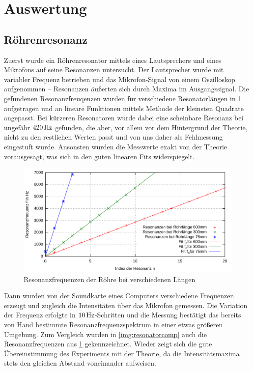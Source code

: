\documentclass[numbers=noenddot,12pt,a4paper]{scrartcl}
\begin{document}
\fancyfoot[L]{\textit{}}
\newpage
\fancyfoot[L]{}

\section{Auswertung}

\subsection{Röhrenresonanz}
Zuerst wurde ein Röhrenresonator mittels eines Lautsprechers und eines Mikrofons auf seine Resonanzen untersucht. Der Lautsprecher wurde mit variabler Frequenz betrieben und das Mikrofon-Signal von einem Oszilloskop aufgenommen -- Resonanzen äußerten sich durch Maxima im Ausgangssignal. Die gefundenen Resonanzfreuqenzen wurden für verschiedene Resonatorlängen in \ref{img:resonatorhand} aufgetragen und an lineare Funktionen mittels Methode der kleinsten Quadrate angepasst. Bei kürzeren Resonatoren wurde dabei eine scheinbare Resonanz bei ungefähr $\unit[420]{Hz}$ gefunden, die aber, vor allem vor dem Hintergrund der Theorie, nicht zu den restlichen Werten passt und von uns daher als Fehlmessung eingestuft wurde. Ansonsten wurden die Messwerte exakt von der Theorie vorausgesagt, was sich in den guten linearen Fits widerspiegelt.
\begin{figure}[H]
	\includegraphics[width=\textwidth]{messwerte/resonanzfrequenzen.pdf}
	\caption{Resonanzfrequenzen der Röhre bei verschiedenen Längen}\label{img:resonatorhand}
\end{figure}
Dann wurden von der Soundkarte eines Computers verschiedene Frequenzen erzeugt und zugleich die Intensitäten über das Mikrofon gemessen. Die Variation der Frequenz erfolgte in $\unit[10]{Hz}$-Schritten und die Messung bestätigt das bereits von Hand bestimmte Resonanzfrequenzspektrum in einer etwas größeren Umgebung. Zum Vergleich wurden in \ref{img:resonatorcomp} auch die Resonanzfrequenzen aus \ref{img:resonatorhand} gekennzeichnet. Wieder zeigt sich die gute Übereinstimmung des Experiments mit der Theorie, da die Intensitätsmaxima stets den gleichen Abstand voneinander aufweisen.
\end{document}
